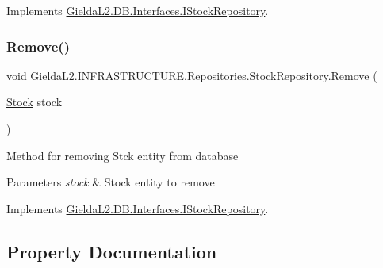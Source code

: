 Implements \mbox{\hyperlink{interface_gielda_l2_1_1_d_b_1_1_interfaces_1_1_i_stock_repository_adceb4897529ba90f63534e22f02c5701}{Gielda\+L2.\+D\+B.\+Interfaces.\+I\+Stock\+Repository}}.

\mbox{\label{class_gielda_l2_1_1_i_n_f_r_a_s_t_r_u_c_t_u_r_e_1_1_repositories_1_1_stock_repository_a939060d75ec4eda1c1d8a0f8824a088f}} 
\subsubsection{\texorpdfstring{Remove()}{Remove()}}
{\footnotesize\ttfamily void Gielda\+L2.\+I\+N\+F\+R\+A\+S\+T\+R\+U\+C\+T\+U\+R\+E.\+Repositories.\+Stock\+Repository.\+Remove (\begin{DoxyParamCaption}\item[{\mbox{\hyperlink{class_gielda_l2_1_1_d_b_1_1_entities_1_1_stock}{Stock}}}]{stock }\end{DoxyParamCaption})}



Method for removing Stck entity from database 


\begin{DoxyParams}{Parameters}
{\em stock} & Stock entity to remove\\
\hline
\end{DoxyParams}


Implements \mbox{\hyperlink{interface_gielda_l2_1_1_d_b_1_1_interfaces_1_1_i_stock_repository_af6aeb871715f10bc3a69ef381050442c}{Gielda\+L2.\+D\+B.\+Interfaces.\+I\+Stock\+Repository}}.



\subsection{Property Documentation}
\mbox{\label{class_gielda_l2_1_1_i_n_f_r_a_s_t_r_u_c_t_u_r_e_1_1_repositories_1_1_stock_repository_ad3ab67441718bfdf224b9302e646f94f}} 
